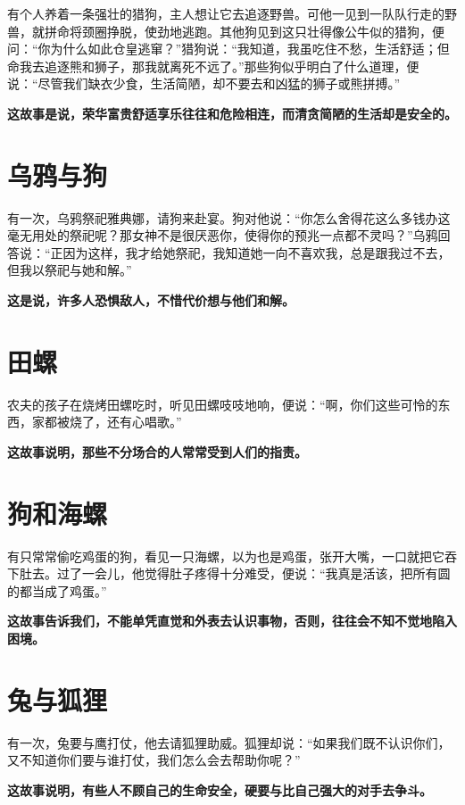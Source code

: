 有个人养着一条强壮的猎狗，主人想让它去追逐野兽。可他一见到一队队行走的野兽，就拼命将颈圈挣脱，使劲地逃跑。其他狗见到这只壮得像公牛似的猎狗，便问：“你为什么如此仓皇逃窜？”猎狗说：“我知道，我虽吃住不愁，生活舒适；但命我去追逐熊和狮子，那我就离死不远了。”那些狗似乎明白了什么道理，便说：“尽管我们缺衣少食，生活简陋，却不要去和凶猛的狮子或熊拼搏。”

{\bfseries \color{red}这故事是说，荣华富贵舒适享乐往往和危险相连，而清贪简陋的生活却是安全的。}

\section{乌鸦与狗}

有一次，乌鸦祭祀雅典娜，请狗来赴宴。狗对他说：“你怎么舍得花这么多钱办这毫无用处的祭祀呢？那女神不是很厌恶你，使得你的预兆一点都不灵吗？”乌鸦回答说：“正因为这样，我才给她祭祀，我知道她一向不喜欢我，总是跟我过不去，但我以祭祀与她和解。”

{\bfseries \color{red}这是说，许多人恐惧敌人，不惜代价想与他们和解。}

\section{田螺}

农夫的孩子在烧烤田螺吃时，听见田螺吱吱地响，便说：“啊，你们这些可怜的东西，家都被烧了，还有心唱歌。”

{\bfseries \color{red}这故事说明，那些不分场合的人常常受到人们的指责。}

\section{狗和海螺}

有只常常偷吃鸡蛋的狗，看见一只海螺，以为也是鸡蛋，张开大嘴，一口就把它吞下肚去。过了一会儿，他觉得肚子疼得十分难受，便说：“我真是活该，把所有圆的都当成了鸡蛋。”

{\bfseries \color{red}这故事告诉我们，不能单凭直觉和外表去认识事物，否则，往往会不知不觉地陷入困境。}

\section{兔与狐狸}

有一次，兔要与鹰打仗，他去请狐狸助威。狐狸却说：“如果我们既不认识你们，又不知道你们要与谁打仗，我们怎么会去帮助你呢？”

{\bfseries \color{red}这故事说明，有些人不顾自己的生命安全，硬要与比自己强大的对手去争斗。}

